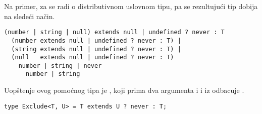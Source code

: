 Na primer, za  se radi o distributivnom uslovnom tipu, pa se rezultujući tip dobija na sledeći način.

\begin{verbatim}
(number | string | null) extends null | undefined ? never : T
  (number extends null | undefined ? never : T) |
  (string extends null | undefined ? never : T) |
  (null   extends null | undefined ? never : T)
    number | string | never
      number | string
\end{verbatim}

Uopštenje ovog pomoćnog tipa je , koji prima dva argumenta  i  i iz  odbacuje .

\begin{verbatim}
type Exclude<T, U> = T extends U ? never : T;
\end{verbatim}
